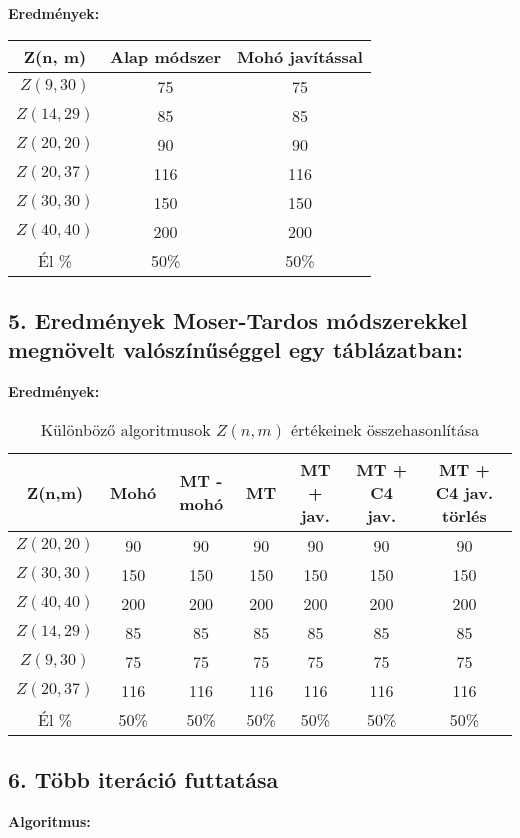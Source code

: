\documentclass[12pt,a4paper]{article}
\begin{document}
\textbf{Eredmények:}
\begin{table}[H]
\centering
\begin{tabular}{|c|c|c|}
\hline
\textbf{Z(n, m)} & \textbf{Alap módszer} & \textbf{Mohó javítással} \\
\hline
$Z(9,30)$  & 75 & 75 \\
$Z(14, 29)$ & 85 & 85 \\
$Z(20, 20)$ & 90 & 90 \\
$Z(20, 37)$ & 116 & 116 \\
$Z(30, 30)$ & 150 & 150 \\
$Z(40, 40)$ & 200 & 200 \\
\hline
Él \% & 50\% & 50\% \\
\hline
\end{tabular}
\end{table}

\subsection*{5. Eredmények Moser-Tardos módszerekkel megnövelt valószínűséggel egy táblázatban:}

\textbf{Eredmények:} 

\begin{table}[H]
\centering
\begin{tabular}{|c|c|c|c|c|c|c|}
\hline
\textbf{Z(n,m)} & \textbf{Mohó} & \textbf{MT - mohó} & \textbf{MT} & \textbf{MT + jav.} & \textbf{MT + C4 jav.} & \textbf{MT + C4 jav. törlés} \\
\hline
$Z(20,20)$ & 90 & 90 & 90 & 90 & 90 & 90 \\
$Z(30,30)$ & 150 & 150 & 150 & 150 & 150 & 150 \\
$Z(40,40)$ & 200 & 200 & 200 & 200 & 200 & 200 \\
$Z(14,29)$ & 85 & 85 & 85 & 85 & 85 & 85 \\
$Z(9,30)$  & 75 & 75 & 75 & 75 & 75 & 75 \\
$Z(20,37)$ & 116 & 116 & 116 & 116 & 116 & 116 \\
\hline
Él \% & 50\% & 50\% & 50\% & 50\% & 50\% & 50\% \\
\hline
\end{tabular}
\caption{Különböző algoritmusok $Z(n,m)$ értékeinek összehasonlítása}
\end{table}

\subsection*{6. Több iteráció futtatása}
\textbf{Algoritmus:}
\end{document}
